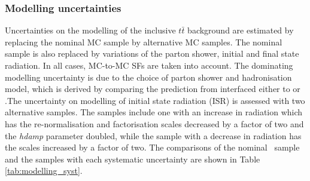 \documentclass[letterpaper,12pt]{article}
\begin{document}
\subsubsection{Modelling uncertainties} Uncertainties on the modelling of the inclusive $t\bar{t}$ 
background are estimated by replacing the nominal MC sample by alternative MC samples. The nominal 
sample is also replaced by variations of the parton shower, initial 
and final state radiation. In all cases, MC-to-MC SFs are taken into account. The dominating modelling
uncertainty is due to the choice of parton shower and hadronisation model, which is derived 
by comparing the prediction from \powheg interfaced either to \pythia or \Herwigpp.The uncertainty on 
modelling of initial state radiation (ISR) is assessed with two alternative \powhegpythia 
samples. The samples include one with an increase in radiation which has the re-normalisation and 
factorisation scales decreased by a factor of two and the \textit{hdamp} parameter doubled, while 
the sample with a decrease in radiation has the scales increased by a factor of two. The comparisons of 
the nominal \ttbar\ sample and the samples with each systematic uncertainty 
are shown in Table \ref{tab:modelling_syst}. 
\end{document}
